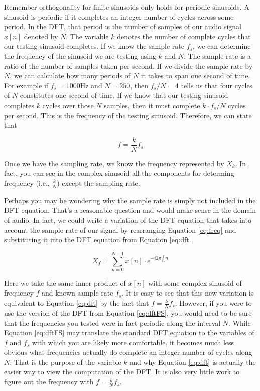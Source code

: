 Remember orthogonality for finite sinusoids only holds for periodic sinusoids.  A sinusoid is periodic if it
completes an integer number of cycles across some period. 
In the DFT, that period is the number of samples of our audio signal $x[n]$ denoted by $N$. 
The variable $k$ denotes
the number of complete cycles that our testing sinusoid completes.  If we know the sample rate $f_s$, we
can determine the frequency of the sinusoid we are testing using $k$ and $N$.  The sample rate is a ratio of
the number of samples taken per second.  If we divide the sample rate by $N$, we can calculate how many 
periods of $N$ it takes to span one second of time.  For example if $f_s = 1000$Hz and $N = 250$, then
$f_s/N = 4$ tells us that four cycles of $N$ constitutes one second of time.  If we know that our testing sinusoid
completes $k$ cycles over those $N$ samples, then it must complete $k \cdot f_s/N$ cycles per second.  This is
the frequency of the testing sinusoid.  Therefore, we can state that 

\begin{equation}
	\label{eq:freq}
	f = \frac{k}{N}f_s
\end{equation} 

\noindent Once we have the sampling rate, we know the
frequency represented by $X_k$.  In fact, you can see in the complex sinusoid
all the components for determing frequency (i.e., $\frac{k}{N}$) except the sampling rate.  
	
	Perhaps
you may be wondering why the sample rate is simply not included in the DFT equation.  That's a reasonable 
question and would make sense in the domain of audio.  In fact, we could write a variation of the DFT equation
that takes into account the sample rate of our signal by rearranging Equation \ref{eq:freq} and substituting it
into the DFT equation from Equation \ref{eq:dft}.

\begin{equation}
\label{eq:dftFS}
	X_f = \sum_{n = 0}^{N - 1}x[n] \cdot e^{-i2\pi \frac{f}{f_s}n}
\end{equation}

\noindent Here we take the same inner product of $x[n]$ with some complex sinusoid of frequency $f$ and known sample
rate $f_s$.  It is easy to see that this new variation is equivalent to Equation \ref{eq:dft} by the fact that 
$f = \frac{k}{N}f_s$.  However, if you were to use the version of the DFT from Equation \ref{eq:dftFS}, you
would need to be sure that the frequencies you tested were in fact periodic along the interval $N$.  While Equation
\ref{eq:dftFS} may translate the standard DFT equation to the variables of $f$ and $f_s$ with which you are likely
more comfortable, it becomes much less obvious what frequencies actually do complete an integer number
of cycles along $N$.  That is the purpose of the variable $k$ and why Equation \ref{eq:dft} is actually the easier
way to view the computation of the DFT.  It is also very little work to figure out the frequency with 
$f = \frac{k}{N}f_s$.

